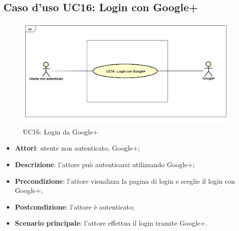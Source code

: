 \newpage
\subsection{Caso d'uso UC16: Login con Google+}
\label{UC16}
\begin{figure}
	\centering
	\includegraphics[scale=0.48]{UML/UC16.png}
	\caption{UC16: Login da Google+}
\end{figure}
\FloatBarrier
\begin{itemize}
	\item \textbf{Attori}: utente non autenticato, Google+;
	\item \textbf{Descrizione}: l'attore può autenticarsi utilizzando Google+;
	\item \textbf{Precondizione}: l'attore visualizza la pagina di login e sceglie il login con Google+;
	\item \textbf{Postcondizione}: l'attore è autenticato;
	\item \textbf{Scenario principale}: l'attore effettua il login tramite Google+.
\end{itemize}
